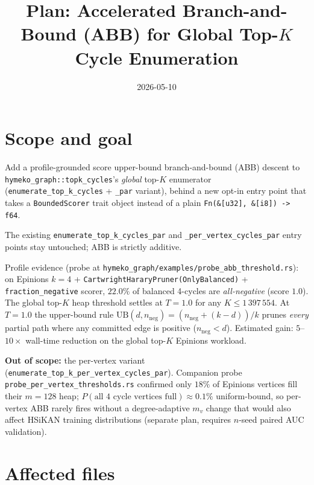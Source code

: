 \documentclass[a4paper,11pt]{article}
\title{Plan: Accelerated Branch-and-Bound (ABB) for Global Top-$K$ Cycle Enumeration}
\author{}
\date{2026-05-10}
\begin{document}
\maketitle

\section*{Scope and goal}

Add a profile-grounded score upper-bound branch-and-bound (ABB) descent
to \texttt{hymeko\_graph::topk\_cycles}'s \emph{global} top-$K$
enumerator (\texttt{enumerate\_top\_k\_cycles} +
\texttt{\_par} variant), behind a new opt-in entry point that takes a
\texttt{BoundedScorer} trait object instead of a plain
\texttt{Fn(\&[u32], \&[i8]) -> f64}.

The existing \texttt{enumerate\_top\_k\_cycles\_par} and
\texttt{\_per\_vertex\_cycles\_par} entry points stay untouched; ABB is
strictly additive.

Profile evidence (probe at \texttt{hymeko\_graph/examples/probe\_abb\_threshold.rs}):
on Epinions $k{=}4$ + \texttt{CartwrightHararyPruner(OnlyBalanced)} +
\texttt{fraction\_negative} scorer, $22.0\%$ of balanced 4-cycles are
\emph{all-negative} (score $1.0$). The global top-$K$ heap threshold
settles at $T{=}1.0$ for any $K \le 1\,397\,554$. At $T{=}1.0$ the
upper-bound rule
\(
  \mathrm{UB}(d, n_{\mathrm{neg}}) = (n_{\mathrm{neg}} + (k-d)) / k
\)
prunes \emph{every} partial path where any committed edge is positive
($n_{\mathrm{neg}} < d$). Estimated gain: $5$--$10\times$ wall-time
reduction on the global top-$K$ Epinions workload.

\textbf{Out of scope:} the per-vertex variant
(\texttt{enumerate\_top\_k\_per\_vertex\_cycles\_par}). Companion probe
\texttt{probe\_per\_vertex\_thresholds.rs} confirmed only $18\%$ of
Epinions vertices fill their $m{=}128$ heap;
$P(\text{all 4 cycle vertices full}) \approx 0.1\%$ uniform-bound, so
per-vertex ABB rarely fires without a degree-adaptive $m_v$ change
that would also affect HSiKAN training distributions
(separate plan, requires $n$-seed paired AUC validation).

\section*{Affected files}
\end{document}
